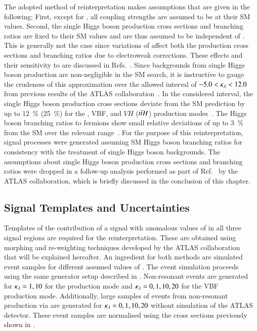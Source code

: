 The adopted method of reinterpretation makes assumptions that are
given in the following: First, except for \klambda, all coupling
strengths are assumed to be at their SM values. Second, the single
Higgs boson production cross sections and branching ratios are fixed
to their SM values and are thus assumed to be independent of
\klambda. This is generally not the case since variations of \klambda
affect both the production cross sections and branching ratios due to
electroweak corrections. These effects and their sensitivity to
\klambda are discussed in
Refs.~\cite{ATL-PHYS-PUB-2019-009,Degrassi:2016wml,Maltoni:2017ims}.
Since backgrounds from single Higgs boson production are
non-negligible in the SM \HH search, it is instructive to gauge the
crudeness of this approximation over the allowed interval of
$-5.0 < \kappa_{\lambda} < 12.0$ from previous results of the ATLAS
collaboration~\cite{HDBS-2018-58}. In the considered \klambda
interval, the single Higgs boson production cross sections deviate
from the SM prediction by up to \SI{12}{\percent} (\SI{25}{\percent})
for the \ggF, VBF, and $VH$ ($t\bar{t} H$) production
modes~\cite{ATL-PHYS-PUB-2019-009}. The Higgs boson branching ratios
to fermions show small relative deviations of up to \SI{3}{\percent}
from the SM over the relevant \klambda
range~\cite{ATL-PHYS-PUB-2019-009}. For the purpose of this
reinterpretation, signal processes were generated assuming SM Higgs
boson branching ratios for consistency with the treatment of single
Higgs boson backgrounds. The assumptions about single Higgs boson
production cross sections and branching ratios were dropped in a
follow-up analysis performed as part of
Ref.~\cite{ATL-HDBS-2022-03-002} by the ATLAS collaboration, which is
briefly discussed in the conclusion of this chapter.


\subsection{Signal Templates and Uncertainties}%
\label{sec:self_coupling_signals}

Templates of the contribution of a signal with anomalous values of
\klambda in all three signal regions are required for the
reinterpretation. These are obtained using morphing and re-weighting
techniques developed by the ATLAS collaboration that will be explained
hereafter. An ingredient for both methods are simulated event samples
for different assumed values of \klambda. The event simulation
proceeds using the same generator setup described in
. Non-resonant \HH events are generated
for $\kappa_{\lambda} = 1, 10$ for the \ggF production mode and
$\kappa_{\lambda} = 0, 1, 10, 20$ for the VBF production mode. Additionally,
large samples of events from non-resonant \HH production via \ggF are
generated for $\kappa_{\lambda} = 0, 1, 10, 20$ without simulation of the
ATLAS detector. These event samples are normalised using the cross
sections previously shown in .

